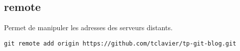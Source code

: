 \subsection*{remote}
Permet de manipuler les adresses des serveurs distants.
\begin{verbatim}
git remote add origin https://github.com/tclavier/tp-git-blog.git
\end{verbatim}
